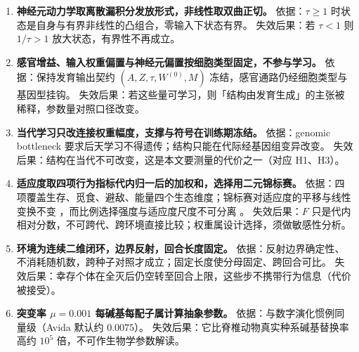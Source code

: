 \begin{enumerate}
  \item \textbf{神经元动力学取离散漏积分发放形式，非线性取双曲正切。}
        依据：$\tau\ge1$ 时状态是自身与有界非线性的凸组合，零输入下状态有界。
        失效后果：若 $\tau<1$ 则 $1/\tau>1$ 放大状态，有界性不再成立。

  \item \textbf{感官增益、输入权重偏置与神经元偏置按细胞类型固定，不参与学习。}
        依据：保持发育输出契约 $(A,Z,\tau,W^{(0)},M)$ 冻结，感官通路仍经细胞类型与基因型挂钩。
        失效后果：若这些量可学习，则「结构由发育生成」的主张被稀释，参数量对照口径改变。

  \item \textbf{当代学习只改连接权重幅度，支撑与符号在训练期冻结。}
        依据：genomic bottleneck 要求后天学习不得遗传；结构只能在代际经基因组变异改变。
        失效后果：结构在当代不可改变，这是本文要测量的代价之一（对应 H1、H3）。

  \item \textbf{适应度取四项行为指标代内归一后的加权和，选择用二元锦标赛。}
        依据：四项覆盖生存、觅食、避敌、能量四个生态维度；锦标赛对适应度的平移与线性变换不变
        \citep{bib136_blickle1996,bib137_eiben2015}，而比例选择强度与适应度尺度不可分离 \citep{bib135_goldberg1991}。
        失效后果：$F$ 只是代内相对分数，不可跨代、跨环境直接比较；权重属设计选择，须做敏感性分析。

  \item \textbf{环境为连续二维闭环，边界反射，回合长度固定。}
        依据：反射边界确定性、不消耗随机数，跨种子对照才成立；固定长度使分母固定、跨回合可比。
        失效后果：幸存个体在全灭后仍空转至回合上限，这些步不携带行为信息（代价被接受）。

  \item \textbf{突变率 $\mu=0.001$ 每碱基每配子属计算抽象参数。}
        依据：与数字演化惯例同量级（Avida 默认约 $0.0075$）。
        失效后果：它比脊椎动物真实种系碱基替换率高约 $10^{5}$ 倍，不可作生物学参数解读。
\end{enumerate}
